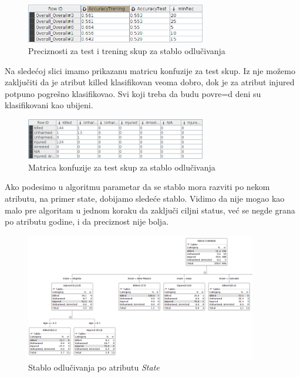 \documentclass[12pt, a4paper]{article}
\def\dj{\leavevmode\setbox0=\hbox{d}\kern0pt
\rlap{\kern.215em\raise.46\ht0\hbox{-}}d}
\begin{document}
\begin{figure}[H]
\centering
\includegraphics[width=0.7\textwidth]
{treeClassifier_accr_childrenKI.png}
\caption{Preciznosti za test i trening skup za stablo odlu\v civanja}
\end{figure}

Na slede\' coj slici imamo prikazanu matricu konfuzije za test skup. Iz nje mo\v zemo zaklju\v citi da je atribut killed klasifikovan veoma dobro, dok je za atribut injured potpuno pogre\v sno klasifikovao. Svi koji treba da budu povre\dj eni su klasifikovani kao ubijeni.

\begin{figure}[H]
\centering
\includegraphics[width=0.7\textwidth]{treeClassifier_confussionMatrix_childrenKI.png}
\caption{Matrica konfuzije za test skup za stablo odlu\v civanja}
\end{figure}


Ako podesimo u algoritmu parametar da se stablo mora razviti po nekom atributu, na primer state, dobijamo slede\' ce stablo.
Vidimo da nije mogao kao malo pre algoritam u jednom koraku da zaklju\v ci ciljni status, ve\'c se negde grana po atributu godine, i da preciznost nije bolja.
\begin{figure}[H]
\centering
\includegraphics[width=0.9\textwidth]{treeClassifier_splitByState_childrenKI.png}
\caption{Stablo odlu\v civanja po atributu \textit{State}}
\end{figure}
\end{document}
